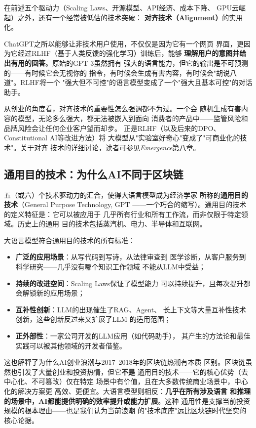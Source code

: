 在前述五个驱动力（Scaling Laws、开源模型、API经济、成本下降、
GPU云崛起）之外，还有一个经常被低估的技术突破：
\textbf{对齐技术（Alignment）}的实用化。

ChatGPT之所以能够让非技术用户使用，不仅仅是因为它有一个网页
界面，更因为它经过RLHF（基于人类反馈的强化学习）训练后，能够
\textbf{理解用户的意图并给出有用的回答}。原始的GPT-3虽然拥有
强大的语言能力，但它的输出是不可预测的——有时候它会无视你的
指令，有时候会生成有害内容，有时候会"胡说八道"。RLHF将一个
"强大但不可控"的语言模型变成了一个"强大且基本可控"的对话
助手。

从创业的角度看，对齐技术的重要性怎么强调都不为过。一个会
随机生成有害内容的模型，无论多么强大，都无法被嵌入到面向
消费者的产品中——监管风险和品牌风险会让任何企业客户望而却步。
正是RLHF（以及后来的DPO、Constitutional AI等改进方法）将
大模型从"实验室好奇心"变成了"可商业化的技术"。关于对齐
技术的详细讨论，读者可参见\textit{Emergence}第八章。

\subsection{通用目的技术：为什么AI不同于区块链}

五（或六）个技术驱动力的汇合，使得大语言模型成为经济学家
所称的\textbf{通用目的技术}（General Purpose Technology, GPT
——一个巧合的缩写）。通用目的技术的定义特征是：它可以被应用于
几乎所有行业和所有工作流，而非仅限于特定领域。历史上的通用
目的技术包括蒸汽机、电力、半导体和互联网。

大语言模型符合通用目的技术的所有标准：
\begin{itemize}
  \item \textbf{广泛的应用场景}：从写代码到写诗，从法律审查到
    医学诊断，从客户服务到科学研究——几乎没有哪个知识工作领域
    不能从LLM中受益；
  \item \textbf{持续的改进空间}：Scaling Laws保证了模型能力
    可以持续提升，且每次提升都会解锁新的应用场景；
  \item \textbf{互补性创新}：LLM的出现催生了RAG、Agent、
    长上下文等大量互补性技术创新，这些创新反过来又扩展了LLM
    的适用范围；
  \item \textbf{正外部性}：一家公司开发的LLM应用（如代码助手），
    其产生的方法论和最佳实践可以被其他领域的开发者借鉴。
\end{itemize}

这也解释了为什么AI创业浪潮与2017--2018年的区块链热潮有本质
区别。区块链虽然也引发了大量创业和投资热情，但它\textbf{不是}
通用目的技术——它的核心优势（去中心化、不可篡改）仅在特定
场景中有价值，且在大多数传统商业场景中，中心化的解决方案更
高效、更便宜。大语言模型则相反：\textbf{几乎在所有涉及语言
和推理的场景中，AI都能提供明确的效率提升或能力扩展}。这种
通用性是支撑当前投资规模的根本理由——也是我们认为当前浪潮
的"技术底座"远比区块链时代坚实的核心论据。

